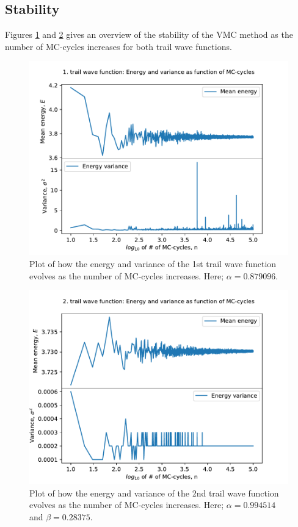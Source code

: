 \documentclass[12pt,english,a4paper]{article}
\begin{document}
\subsection{Stability} \label{section:results:stability}

Figures \ref{fig:stability_1} and \ref{fig:stability_2} gives an overview of the stability of the VMC method as the number of MC-cycles increases for both trail wave functions.

\begin{figure}[H]
    \centering
    \includegraphics[scale=0.7]{../figures/plot_stability_trail_1.pdf}
    \caption{Plot of how the energy and variance of the 1st trail wave function evolves as the number of MC-cycles increases. Here; $\alpha=0.879096$.}
    \label{fig:stability_1}
\end{figure}
\begin{figure}[H]
    \centering
    \includegraphics[scale=0.7]{../figures/plot_stability_trail_2.pdf}
    \caption{Plot of how the energy and variance of the 2nd trail wave function evolves as the number of MC-cycles increases. Here; $\alpha=0.994514$ and $\beta=0.28375$.}
    \label{fig:stability_2}
\end{figure}
\end{document}
